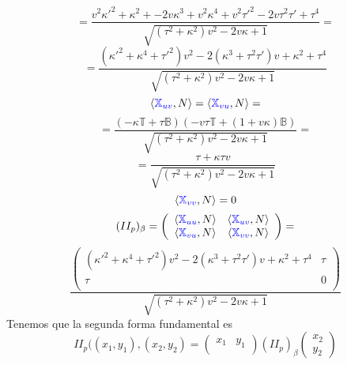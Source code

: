 \documentclass{article}
\newcommand{\bb}[1]{\mathbb{#1}}
\begin{document}
\begin{multicols}{2}
$$$$
$$
=\frac{v^2\kappa'^2 + \kappa^2 + -2 v\kappa^3 + v^2 \kappa^4 + v^2\tau'^2 -2v\tau^2\tau'+\tau^4}{\sqrt{(\tau^2+\kappa^2)v^2-2v\kappa+1}}=
$$
$$
=\frac{(\kappa'^2+\kappa^4+\tau'^2)v^2 - 2(\kappa^3+\tau^2\tau') v +\kappa^2 + \tau^4}{\sqrt{(\tau^2+\kappa^2)v^2-2v\kappa+1}}
$$
$$
\langle \textcolor{blue}{\bb{X}_{uv}}, N \rangle =\langle \textcolor{blue}{\bb{X}_{vu}}, N \rangle =
$$
$$
=\frac{(-\kappa \bb{T} + \tau \bb{B})(-v\tau \bb{T} + (1 + v\kappa) \bb{B})}{\sqrt{(\tau^2+\kappa^2)v^2-2v\kappa+1}} =
$$
$$
=\frac{\tau + \kappa\tau v}{\sqrt{(\tau^2+\kappa^2)v^2-2v\kappa+1}}
$$
$$
\langle \textcolor{blue}{\bb{X}_{vv}}, N \rangle = 0
$$
$$
(II_p)_\beta =
\left(\begin{array}{cc}
    \langle \textcolor{blue}{\bb{X}_{uu}}, N \rangle & \langle \textcolor{blue}{\bb{X}_{uv}}, N \rangle \\
    \langle \textcolor{blue}{\bb{X}_{vu}}, N \rangle & \langle \textcolor{blue}{\bb{X}_{vv}}, N \rangle \\
\end{array}\right) =
$$
$$
\frac{
\left(\begin{array}{cc}
    (\kappa'^2+\kappa^4+\tau'^2)v^2 - 2(\kappa^3+\tau^2\tau') v +\kappa^2 + \tau^4 & \tau \\
    \tau & 0 \\
\end{array}\right)
}{\sqrt{(\tau^2+\kappa^2)v^2-2v\kappa+1}}
$$
Tenemos que la segunda forma fundamental es
$$
II_p((x_1,y_1),(x_2,y_2) =
\left(\begin{array}{cc}
    x_1 & y_1 \\
\end{array}\right) (II_p)_\beta \left(\begin{array}{cc}
    x_2 \\
    y_2
\end{array}\right)
$$


\end{multicols}
\end{document}
